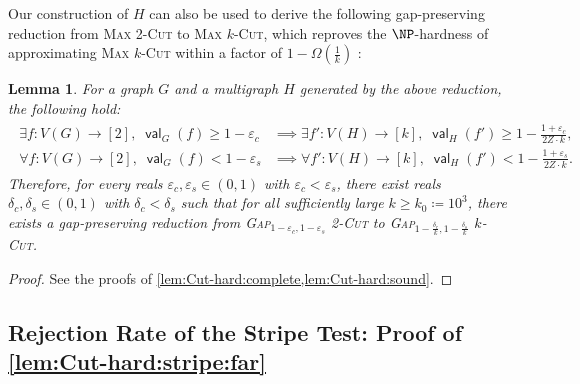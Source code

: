 \documentclass[11pt,fleqn]{article}
\renewcommand{\geq}{\geqslant}
\renewcommand{\epsilon}{\varepsilon}
\newcommand{\prb}[1]{\textsc{#1}\xspace}
\newcommand{\defeq}{\coloneq}
\DeclareMathOperator{\val}{\mathsf{val}}
\newcommand{\f}{f}
\newcommand{\kzero}{10^3}
\newtheorem{lemma}[theorem]{Lemma}
\theoremstyle{definition}
\numberwithin{equation}{section}
\begin{document}
Our construction of $H$ can also be used to derive the following gap-preserving reduction
from \prb{Max 2-Cut} to \prb{Max $k$-Cut},
which reproves the $\NP$-hardness of approximating \prb{Max $k$-Cut}
within a factor of $1 - \Omega\left(\frac{1}{k}\right)$ \cite{kann1997hardness,guruswami2013improved}:
\begin{lemma}
\label{lem:Cut-hard:KKLP97}
    For a graph $G$ and a multigraph $H$ generated by the above reduction,
    the following hold\textup{:}
    \begin{align}
    \begin{aligned}
        \exists \f \colon V(G) \to [2], \; \val_G(\f) \geq 1-\epsilon_c
        & \implies
        \exists \f' \colon V(H) \to [k], \; \val_H(\f') \geq 1 - \frac{1+\epsilon_c}{2Z \cdot k}, \\
        \forall \f \colon V(G) \to [2], \; \val_G(\f) < 1-\epsilon_s
        & \implies
        \forall \f' \colon V(H) \to [k], \; \val_H(\f') < 1 - \frac{1+\epsilon_s}{2Z \cdot k}.
    \end{aligned}
    \end{align}
    Therefore,
    for every reals $\epsilon_c,\epsilon_s \in (0,1)$ with $\epsilon_c < \epsilon_s$,
    there exist reals $\delta_c, \delta_s \in (0,1)$ with $\delta_c < \delta_s$ such that
    for all sufficiently large $k \geq k_0 \defeq \kzero$,
    there exists a gap-preserving reduction from
    \prb{Gap$_{1-\epsilon_c,1-\epsilon_s}$ 2-Cut}
    to
    \prb{Gap$_{1-\frac{\delta_c}{k},1-\frac{\delta_s}{k}}$ $k$-Cut}.
\end{lemma}
\begin{proof}
    See the proofs of \cref{lem:Cut-hard:complete,lem:Cut-hard:sound}.
\end{proof}


\subsection{Rejection Rate of the Stripe Test: Proof of \texorpdfstring{\cref{lem:Cut-hard:stripe:far}}{Lemma~\protect\ref{lem:Cut-hard:stripe:far}}}
\label{sec:Cut-hard:stripe:far}
\end{document}
